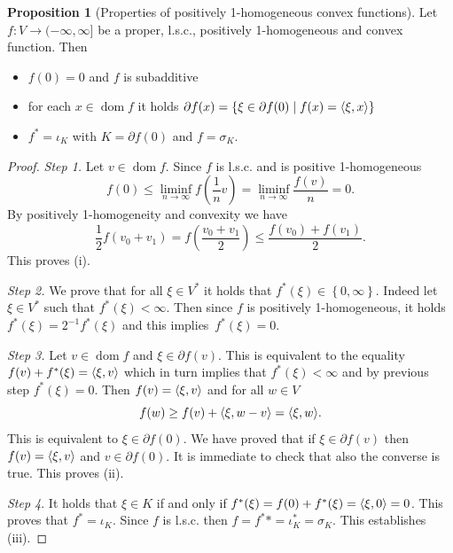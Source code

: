 \documentclass[a4paper,10pt,twoside]{amsbook}
\numberwithin{section}{chapter}
\numberwithin{equation}{chapter}
\theoremstyle{definition}
\newtheorem{prop}{Proposition}[chapter]
\DeclareMathOperator{\dom}{dom}
\DeclarePairedDelimiter{\dual}{\langle}{\rangle}
\begin{document}
\begin{prop}[Properties of positively 1-homogeneous convex functions]
\label{prop:prop-pos-1-hom-convx}
Let $f\colon V\to(-\infty,\infty]$ be a proper, l.s.c., positively 1-homogeneous and convex function. Then
\begin{itemize}
\item[(i)] $f(0)=0$ and $f$ is subadditive
\item[(ii)] for each $x\in\dom f$ it holds $\partial f(x)=\{\xi\in\partial f(0)\;|\;f(x)=\dual{\xi,x}\}$
\item[(iii)] $f^*=\iota_K$ with $K=\partial f(0)$ and $f=\sigma_K$.
\end{itemize}
\end{prop}
\begin{proof}
\emph{Step 1.} Let $v\in\dom f$. Since $f$ is l.s.c. and is positive 1-homogeneous
\begin{equation*}
f(0)\le\liminf_{n\to\infty}f\left(\frac{1}{n}v\right)=\liminf_{n\to\infty}\frac{f(v)}{n}=0.
\end{equation*}
By positively 1-homogeneity and convexity we have
\begin{equation*}
\frac{1}{2}f(v_0+v_1)=f\left(\frac{v_0+v_1}{2}\right)\le\frac{f(v_0)+f(v_1)}{2}.
\end{equation*}
This proves (i).

\emph{Step 2.} We prove that for all $\xi\in V^*$ it holds that $f^*(\xi)\in\left\{0,\infty\right\}$. Indeed let $\xi\in V^*$ such that $f^*(\xi)<\infty$. Then since $f$ is positively 1-homogeneous, it holds $f^*(\xi)=2^{-1}f^*(\xi)$ and this implies~$f^*(\xi)=0$.

\emph{Step 3.} Let $v\in\dom f$ and $\xi\in\partial f(v)$. This is equivalent to the equality $f(v)+f^*(\xi)=\dual{\xi,v}$ which in turn implies that $f^*(\xi)<\infty$ and by previous step $f^*(\xi)=0$. Then $f(v)=\dual{\xi,v}$ and for all $w\in V$
\begin{equation*}
f(w)\ge f(v)+\dual{\xi,w-v}=\dual{\xi,w}.
\end{equation*}
This is equivalent to $\xi\in\partial f(0)$. We have proved that if $\xi\in\partial f(v)$ then $f(v)=\dual{\xi,v}$ and $v\in\partial f(0)$. It is immediate to check that also the converse is true. This proves (ii).

\emph{Step 4}. It holds that $\xi\in K$ if and only if $f^*(\xi)=f(0)+f^*(\xi)=\dual{\xi,0}=0$. This proves that $f^*=\iota_K$. Since $f$ is l.s.c. then $f=f^**=\iota_K^*=\sigma_K$. This establishes (iii).
\end{proof}
\end{document}
